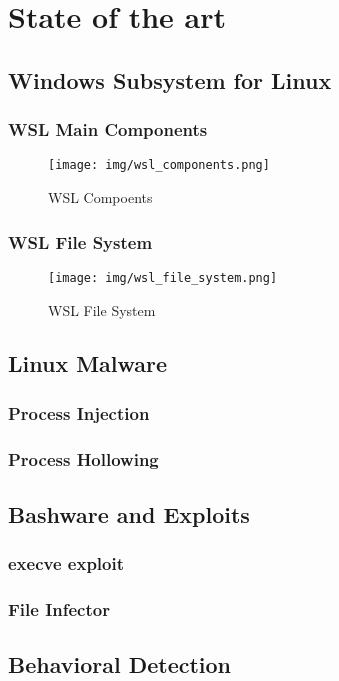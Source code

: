 \chapter{State of the art}
    \section{Windows Subsystem for Linux}
        \subsection{WSL Main Components}
            \begin{figure}[H]
                \texttt{[image: img/wsl\_components.png]}
                \caption{WSL Compoents \protect\cite{wslcomponents}}
                \label{fig:wsl_components}
            \end{figure}
        \subsection{WSL File System}
            \begin{figure}[H]
                \texttt{[image: img/wsl\_file\_system.png]}
                \caption{WSL File System \protect\cite{wslfilesystem}}
                \label{fig:wsl_file_system}
            \end{figure}
    \section{Linux Malware}
        \subsection{Process Injection}
        \subsection{Process Hollowing}
    \section{Bashware and Exploits}
        \subsection{execve exploit}
        \subsection{File Infector}
    \section{Behavioral Detection}
    